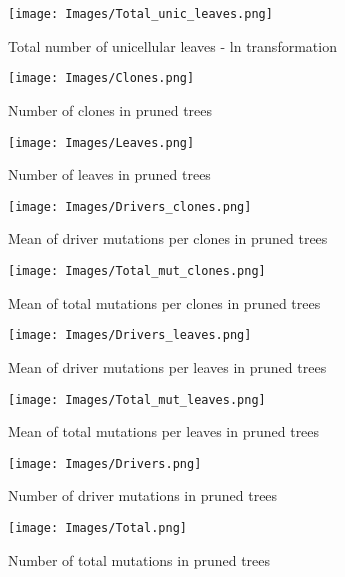\documentclass[a4paper]{article}
\begin{document}
\begin{figure}
	\texttt{[image: Images/Total\_unic\_leaves.png]}
	\caption{Total number of unicellular leaves - ln transformation}
	\label{Total unic leaves}
\end{figure}
\newpage
\begin{figure}
	\texttt{[image: Images/Clones.png]}
	\caption{Number of clones in pruned trees}
	\label{Clones}
\end{figure}

\begin{figure}
	\texttt{[image: Images/Leaves.png]}
	\caption{Number of leaves in pruned trees}
	\label{Leaves}
\end{figure}
\newpage
\begin{figure}
	\texttt{[image: Images/Drivers\_clones.png]}
	\caption{Mean of driver mutations per clones in pruned trees}
	\label{Drivers per clones}
\end{figure}

\begin{figure}
	\texttt{[image: Images/Total\_mut\_clones.png]}
	\caption{Mean of total mutations per clones in pruned trees}
	\label{Total per clones}
\end{figure}
\newpage
\begin{figure}
	\texttt{[image: Images/Drivers\_leaves.png]}
	\caption{Mean of driver mutations per leaves in pruned trees}
	\label{Drivers per leaves}
\end{figure}

\begin{figure}
	\texttt{[image: Images/Total\_mut\_leaves.png]}
	\caption{Mean of total mutations per leaves in pruned trees}
	\label{Total per leaves}
\end{figure}
\newpage
\begin{figure}
	\texttt{[image: Images/Drivers.png]}
	\caption{Number of driver mutations in pruned trees}
	\label{Drivers unique}
\end{figure}

\begin{figure}
	\texttt{[image: Images/Total.png]}
	\caption{Number of total mutations in pruned trees}
	\label{Total unique}
\end{figure}
\restoregeometry
\end{document}
